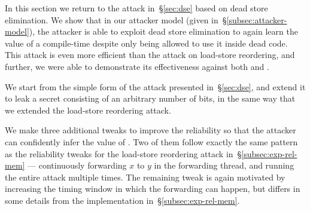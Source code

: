 In this section we return to the attack in~\S\ref{sec:dse} based on
dead store elimination.
We show that in our attacker model (given in~\S\ref{subsec:attacker-model}),
the attacker is able to exploit dead
store elimination to again learn the value of a compile-time {\SEC}
despite only being allowed to use it inside dead code.
This attack is even more efficient than the attack on load-store reordering,
and further, we were able to demonstrate its effectiveness against both
{\GCC} and {\CLANG}.

We start from the simple form of the attack presented in~\S\ref{sec:dse},
and extend it to leak a secret consisting of an
arbitrary number of bits, in the same way that we extended the load-store
reordering attack.
We make three additional tweaks to improve the reliability so that the attacker
can confidently infer the value of {\SEC}.
Two of them follow exactly the same pattern as the reliability tweaks
for the load-store reordering attack in~\S\ref{subsec:exp-rel-mem} ---
continuously forwarding $x$ to $y$ in the forwarding thread, and running the
entire attack multiple times.
The remaining tweak is again motivated by increasing the timing window in
which the forwarding can happen, but differs in some details from the
implementation in~\S\ref{subsec:exp-rel-mem}.

